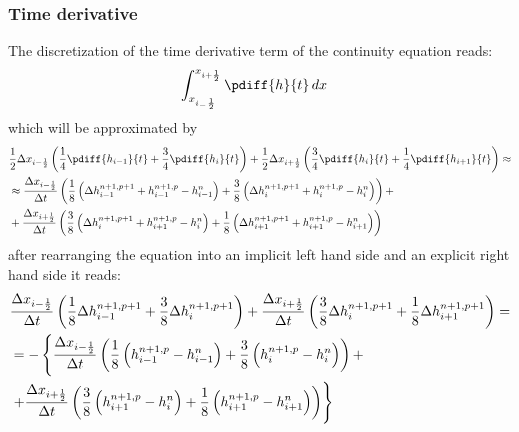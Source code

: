 \subsubsection{Time derivative}
The discretization of the time derivative term of the continuity equation reads:
\begin{align}
    & \int^{x_{i+\half}}_{x_{i_-\half}} \pdiff{h}{t}\, dx
\end{align}
which will be approximated by
\begin{align}
    &\half \Delta x_{i-\half} \left( \frac{1}{4}\pdiff{h_{i-1}}{t} + \frac{3}{4}\pdiff{h_{i}}{t}  \right) +
    \half \Delta x_{i+\half} \left( \frac{3}{4}\pdiff{h_{i}}{t} + \frac{1}{4}\pdiff{h_{i+1}}{t} \right) \approx
    \nonumber \\*
    & \approx
    \frac{\Delta x_{i-\half}}{\Dt} \left(
    \frac{1}{8}\left(\Delta h^{n+1,p+1}_{i-1} + h^{n+1,p}_{i-1} - h^{n}_{i-1} \right) + \frac{3}{8}\left(\Delta h^{n+1,p+1}_{i} + h^{n+1,p}_{i}- h^{n}_{i}\right)
    \right) +
    \nonumber \\*
    & +
    \frac{\Delta x_{i+\half}}{\Dt} \left( \frac{3}{8}\left(\Delta h^{n+1,p+1}_{i} + h^{n+1,p}_{i+1}- h^{n}_{i}\right) + \frac{1}{8}\left(\Delta h^{n+1,p+1}_{i+1} + h^{n+1,p}_{i+1}- h^{n}_{i+1}\right)
    \right)
\end{align}
after rearranging the equation into an implicit left hand side and an explicit right hand side  it reads:
\begin{align}
    &  \frac{\Delta x_{i-\frac{1}{2}}}{\Delta t} \left(
    \frac{1}{8}\Delta h^{n+1,p+1}_{i-1} + \frac{3}{8}\Delta h^{n+1,p+1}_{i}
    \right) +
    \frac{\Delta x_{i+\frac{1}{2}}}{\Delta t} \left( \frac{3}{8}\Delta h^{n+1,p+1}_{i} + \frac{1}{8}\Delta h^{n+1,p+1}_{i+1}
    \right) =
    \nonumber \\
    &  = -\left\{
    \frac{\Delta x_{i-\frac{1}{2}}}{\Delta t} \left(
\frac{1}{8}\left(h^{n+1,p}_{i-1} - h^{n}_{i-1} \right) + \frac{3}{8}\left(h^{n+1,p}_{i}- h^{n}_{i}\right)
\right) + \right.
\nonumber \\*
& \left. +
\frac{\Delta x_{i+\frac{1}{2}}}{\Delta t} \left( \frac{3}{8}\left(h^{n+1,p}_{i+1}- h^{n}_{i}\right) + \frac{1}{8}\left(h^{n+1,p}_{i+1}- h^{n}_{i+1}\right)
\right)\right\}
\end{align}

